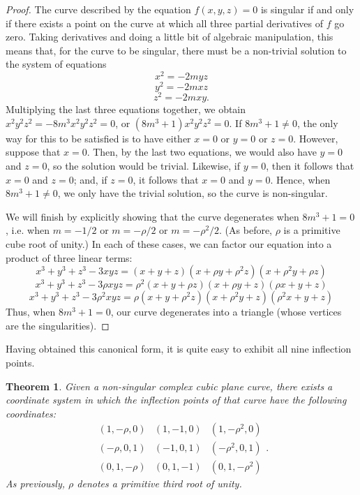 \documentclass[12pt]{article}
\newtheorem{thm}{Theorem}
\begin{document}
\begin{proof}
The curve described by the equation $f(x,y,z) = 0$ is singular 
if and only if there exists a point on the curve at which all
three partial derivatives of $f$ go zero.  Taking derivatives 
and doing a little bit of algebraic manipulation, this means 
that, for the curve to be singular, there must be a non-trivial
solution to the system of equations
\[ x^2 = -2myz \]
\[ y^2 = -2mxz \]
\[ z^2 = -2mxy .\]
Multiplying the last three equations together, we obtain
$x^2 y^2 z^2 = -8m^3 x^2 y^2 z^2 = 0$, or 
$(8m^3 + 1) x^2 y^2 z^2 = 0$.  If $8m^3 + 1 \neq 0$, the only
way for this to be satisfied is to have either $x=0$ or $y=0$
or $z=0$.  However, suppose that $x=0$.  Then, by the last two 
equations, we would also have $y=0$ and $z=0$, so the solution
would be trivial.  Likewise, if $y=0$, then it follows that
$x=0$ and $z=0$; and, if $z=0$, it follows that $x=0$ and $y=0$.
Hence, when $8m^3 + 1 \neq 0$, we only have the trivial solution,
so the curve is non-singular.

We will finish by explicitly showing that the curve degenerates
when $8m^3 + 1 = 0$, i.e. when $m=-1/2$ or $m=-\rho/2$ or 
$m=-\rho^2/2$. (As before, $\rho$ is a primitive cube 
root of unity.)  In each of these cases, we can factor our
equation into a product of three linear terms:
\[
 x^3 + y^3 + z^3 - 3xyz =
 (x + y + z)(x + \rho y + \rho^2 z) (x + \rho^2 y + \rho z)
\]
\[
 x^3 + y^3 + z^3 - 3\rho xyz =
 \rho^2 (x + y + \rho z)(x + \rho y + z)(\rho x + y + z)
\]
\[
 x^3 + y^3 + z^3 - 3\rho^2 xyz =
 \rho (x + y + \rho^2 z)(x + \rho^2 y + z)(\rho^2 x + y + z)
\]
Thus, when $8m^3 + 1 = 0$, our curve degenerates into a triangle
(whose vertices are the singularities).
\end{proof}

Having obtained this canonical form, it is quite easy to exhibit all
nine inflection points. 


\begin{thm}
Given a non-singular complex cubic plane curve, there
exists a coordinate system in which the inflection
points of that curve have the following coordinates:
\[ \begin{matrix}
 (1, -\rho, 0) & (1, -1, 0) & (1, -\rho^2, 0) \\
 (-\rho, 0, 1) & (-1, 0, 1) & (-\rho^2, 0, 1) \\
 (0, 1, -\rho) & (0, 1, -1) & (0, 1, -\rho^2)
\end{matrix}. \]
As previously, $\rho$ denotes a primitive third root of unity.
\end{thm}
\end{document}
